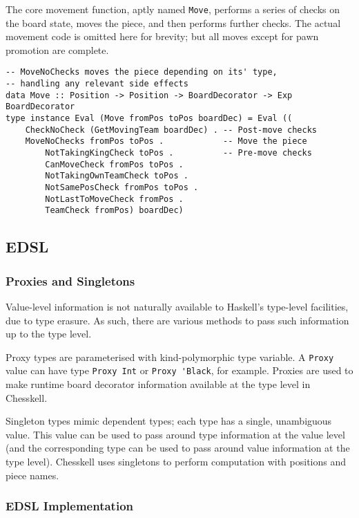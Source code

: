 \documentclass[12pt, a4paper]{scrartcl}
\begin{document}
The core movement function, aptly named \lstinline{Move}, performs a series of checks on the board state, moves the piece, and then performs further checks. The actual movement code is omitted here for brevity; but all moves except for pawn promotion are complete.

\begin{lstlisting}
-- MoveNoChecks moves the piece depending on its' type,
-- handling any relevant side effects
data Move :: Position -> Position -> BoardDecorator -> Exp BoardDecorator
type instance Eval (Move fromPos toPos boardDec) = Eval ((
    CheckNoCheck (GetMovingTeam boardDec) . -- Post-move checks
    MoveNoChecks fromPos toPos .            -- Move the piece
        NotTakingKingCheck toPos .          -- Pre-move checks
        CanMoveCheck fromPos toPos .
        NotTakingOwnTeamCheck toPos .
        NotSamePosCheck fromPos toPos .
        NotLastToMoveCheck fromPos .
        TeamCheck fromPos) boardDec)
\end{lstlisting}

\subsection{EDSL}

\subsubsection{Proxies and Singletons}

Value-level information is not naturally available to Haskell's type-level facilities, due to type erasure. As such, there are various methods to pass such information up to the type level.

Proxy types are parameterised with kind-polymorphic type variable\cite{yorgey2012giving}. A \lstinline{Proxy} value can have type \lstinline{Proxy Int} or \lstinline{Proxy 'Black}, for example. Proxies are used to make runtime board decorator information available at the type level in Chesskell.

Singleton types mimic dependent types\cite{singletons}; each type has a single, unambiguous value. This value can be used to pass around type information at the value level (and the corresponding type can be used to pass around value information at the type level). Chesskell uses singletons to perform computation with positions and piece names.

\subsubsection{EDSL Implementation}
\end{document}
